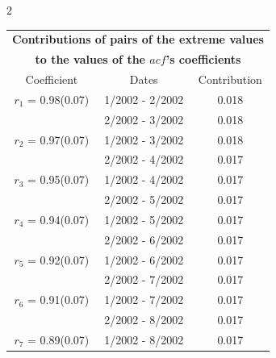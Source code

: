 
\thispagestyle{empty}
\begin{multicols}{2}{ 
\begin{tabular}{ccc}
\multicolumn{3}{c}{\textbf{Contributions of pairs of the extreme values} }  \vspace{-.10in}  \\ 
\multicolumn{3}{c}{ \textbf{to the values of the $acf$'s coefficients}} \\ 
\hline 
\hline                  Coefficient  &  Dates &  Contribution \\ 
\hline 
  $r_{ 1}$ = 0.98(0.07) &       1/2002 -  2/2002 &        0.018   \vspace{-.10in} \\  
&        2/2002 -  3/2002 &        0.018  \vspace{-.02in} \\ \hline 
  $r_{ 2}$ = 0.97(0.07) &       1/2002 -  3/2002 &        0.018   \vspace{-.10in} \\  
&        2/2002 -  4/2002 &        0.017  \vspace{-.02in} \\ \hline 
  $r_{ 3}$ = 0.95(0.07) &       1/2002 -  4/2002 &        0.017   \vspace{-.10in} \\  
&        2/2002 -  5/2002 &        0.017  \vspace{-.02in} \\ \hline 
  $r_{ 4}$ = 0.94(0.07) &       1/2002 -  5/2002 &        0.017   \vspace{-.10in} \\  
&        2/2002 -  6/2002 &        0.017  \vspace{-.02in} \\ \hline 
  $r_{ 5}$ = 0.92(0.07) &       1/2002 -  6/2002 &        0.017   \vspace{-.10in} \\  
&        2/2002 -  7/2002 &        0.017  \vspace{-.02in} \\ \hline 
  $r_{ 6}$ = 0.91(0.07) &       1/2002 -  7/2002 &        0.017   \vspace{-.10in} \\  
&        2/2002 -  8/2002 &        0.017  \vspace{-.02in} \\ \hline 
  $r_{ 7}$ = 0.89(0.07) &       1/2002 -  8/2002 &        0.017   \vspace{-.10in} \\  

\end{tabular}}
\end{multicols}
